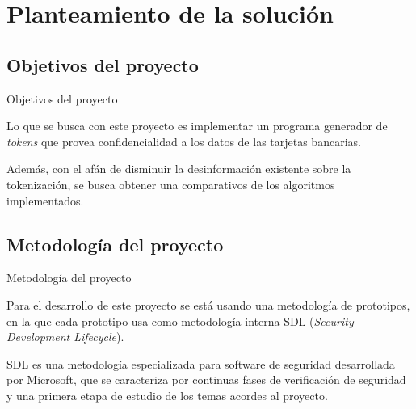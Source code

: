 %
%

\section{Planteamiento de la solución}

\subsection{Objetivos del proyecto} %
\begin{frame}{Objetivos del proyecto}

  Lo que se busca con este proyecto es implementar un programa generador de
  \textit{tokens} que provea confidencialidad a los datos de las tarjetas
  bancarias.

  Además, con el afán de disminuir la desinformación existente sobre la
  tokenización, se busca obtener una comparativos de los algoritmos
  implementados.
  
\end{frame}

\subsection{Metodología del proyecto} %
\begin{frame}{Metodología del proyecto}

  Para el desarrollo de este proyecto se está usando una metodología de
  prototipos, en la que cada prototipo usa como metodología interna SDL
  (\textit{Security Development Lifecycle}).

  SDL es una metodología especializada para software de seguridad desarrollada
  por Microsoft, que se caracteriza por continuas fases de verificación de
  seguridad y una primera etapa de estudio de los temas acordes al proyecto.
  
\end{frame}

